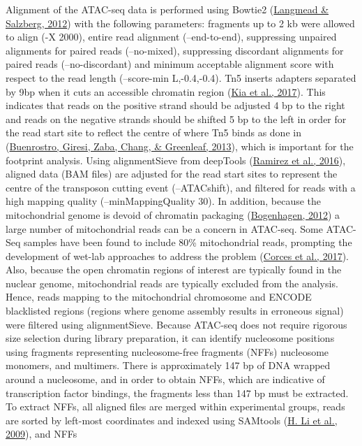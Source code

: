 \documentclass[12pt,twoside]{reedthesis}
\begin{document}
Alignment of the ATAC-seq data is performed using Bowtie2
(\protect\hyperlink{ref-langmead2012}{Langmead \& Salzberg, 2012}) with the following parameters: fragments up to 2 kb were
allowed to align (-X 2000), entire read alignment (--end-to-end),
suppressing unpaired alignments for paired reads (--no-mixed),
suppressing discordant alignments for paired reads (--no-discordant) and
minimum acceptable alignment score with respect to the read length
(--score-min L,-0.4,-0.4). Tn5 inserts adapters separated by 9bp when it
cuts an accessible chromatin region (\protect\hyperlink{ref-kia2017}{Kia et al., 2017}). This indicates that
reads on the positive strand should be adjusted 4 bp to the right and
reads on the negative strands should be shifted 5 bp to the left in
order for the read start site to reflect the centre of where Tn5 binds
as done in (\protect\hyperlink{ref-buenrostro2013}{Buenrostro, Giresi, Zaba, Chang, \& Greenleaf, 2013}), which is important for the footprint
analysis. Using alignmentSieve from deepTools (\protect\hyperlink{ref-ramirez2016}{Ramirez et al., 2016}), aligned
data (BAM files) are adjusted for the read start sites to represent the
centre of the transposon cutting event (--ATACshift), and filtered for
reads with a high mapping quality (--minMappingQuality 30). In addition,
because the mitochondrial genome is devoid of chromatin packaging
(\protect\hyperlink{ref-bogenhagen2012}{Bogenhagen, 2012}) a large number of mitochondrial reads can be a concern
in ATAC-seq. Some ATAC-Seq samples have been found to include 80\%
mitochondrial reads, prompting the development of wet-lab approaches to
address the problem (\protect\hyperlink{ref-corces2017}{Corces et al., 2017}). Also, because the open chromatin
regions of interest are typically found in the nuclear genome,
mitochondrial reads are typically excluded from the analysis. Hence,
reads mapping to the mitochondrial chromosome and ENCODE blacklisted
regions (regions where genome assembly results in erroneous signal) were
filtered using alignmentSieve. Because ATAC-seq does not require
rigorous size selection during library preparation, it can identify
nucleosome positions using fragments representing nucleosome-free
fragments (NFFs) nucleosome monomers, and multimers. There is
approximately 147 bp of DNA wrapped around a nucleosome, and in order to
obtain NFFs, which are indicative of transcription factor bindings, the
fragments less than 147 bp must be extracted. To extract NFFs, all
aligned files are merged within experimental groups, reads are sorted by
left-most coordinates and indexed using SAMtools (\protect\hyperlink{ref-li2009}{H. Li et al., 2009}), and NFFs
\end{document}
